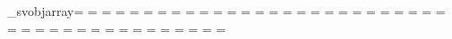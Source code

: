 {{        \fontdimen\indexb\_svobjarray=\onesp %
            \indexd=\cntFactorClass
\cntDeltaAA=\fontdimen\indexd\wheelcogdeltas
\multiply\cntDeltaAA\cntFactor
\indexd=\fontdimen\indexd\wheelcognext
\cntDeltaAB=\fontdimen\indexd\wheelcogdeltas
\multiply\cntDeltaAB\cntFactor
\indexd=\fontdimen\indexd\wheelcognext
\cntDeltaAC=\fontdimen\indexd\wheelcogdeltas
\multiply\cntDeltaAC\cntFactor
\indexd=\fontdimen\indexd\wheelcognext
\cntDeltaAD=\fontdimen\indexd\wheelcogdeltas
\multiply\cntDeltaAD\cntFactor
\indexd=\fontdimen\indexd\wheelcognext
\cntDeltaAE=\fontdimen\indexd\wheelcogdeltas
\multiply\cntDeltaAE\cntFactor
\indexd=\fontdimen\indexd\wheelcognext
\cntDeltaAF=\fontdimen\indexd\wheelcogdeltas
\multiply\cntDeltaAF\cntFactor
\indexd=\fontdimen\indexd\wheelcognext
\cntDeltaAG=\fontdimen\indexd\wheelcogdeltas
\multiply\cntDeltaAG\cntFactor
\indexd=\fontdimen\indexd\wheelcognext
\cntDeltaAH=\fontdimen\indexd\wheelcogdeltas
\multiply\cntDeltaAH\cntFactor
\indexd=\fontdimen\indexd\wheelcognext
\cntDeltaBA=\fontdimen\indexd\wheelcogdeltas
\multiply\cntDeltaBA\cntFactor
\indexd=\fontdimen\indexd\wheelcognext
\cntDeltaBB=\fontdimen\indexd\wheelcogdeltas
\multiply\cntDeltaBB\cntFactor
\indexd=\fontdimen\indexd\wheelcognext
\cntDeltaBC=\fontdimen\indexd\wheelcogdeltas
\multiply\cntDeltaBC\cntFactor
\indexd=\fontdimen\indexd\wheelcognext
\cntDeltaBD=\fontdimen\indexd\wheelcogdeltas
\multiply\cntDeltaBD\cntFactor
\indexd=\fontdimen\indexd\wheelcognext
\cntDeltaBE=\fontdimen\indexd\wheelcogdeltas
\multiply\cntDeltaBE\cntFactor
\indexd=\fontdimen\indexd\wheelcognext
\cntDeltaBF=\fontdimen\indexd\wheelcogdeltas
\multiply\cntDeltaBF\cntFactor
\indexd=\fontdimen\indexd\wheelcognext
\cntDeltaBG=\fontdimen\indexd\wheelcogdeltas
\multiply\cntDeltaBG\cntFactor
\indexd=\fontdimen\indexd\wheelcognext
\cntDeltaBH=\fontdimen\indexd\wheelcogdeltas
\multiply\cntDeltaBH\cntFactor
\indexd=\fontdimen\indexd\wheelcognext
\cntDeltaCA=\fontdimen\indexd\wheelcogdeltas
\multiply\cntDeltaCA\cntFactor
\indexd=\fontdimen\indexd\wheelcognext
\cntDeltaCB=\fontdimen\indexd\wheelcogdeltas
\multiply\cntDeltaCB\cntFactor
\indexd=\fontdimen\indexd\wheelcognext
\cntDeltaCC=\fontdimen\indexd\wheelcogdeltas
\multiply\cntDeltaCC\cntFactor
\indexd=\fontdimen\indexd\wheelcognext
\cntDeltaCD=\fontdimen\indexd\wheelcogdeltas
\multiply\cntDeltaCD\cntFactor
\indexd=\fontdimen\indexd\wheelcognext
\cntDeltaCE=\fontdimen\indexd\wheelcogdeltas
\multiply\cntDeltaCE\cntFactor
}}
